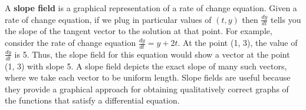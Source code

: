 \clearpage

A \textbf{slope field} is a graphical representation of a rate of change equation. Given a rate of change equation, if we plug in particular values of $(t,y)$ then $\displaystyle\frac{dy}{dt}$ tells you the slope of the tangent vector to the solution at that point.
\vs
For example, consider the rate of change equation $\displaystyle\frac{dy}{dt}=y+2t$.  At the point (1, 3), the value of $\displaystyle\frac{dy}{dt}$ is 5. Thus, the slope field for this equation would show a vector at the point (1, 3) with slope 5.  A slope field depicts the exact slope of many such vectors, where we take each vector to be uniform length. Slope fields are useful because they provide a graphical approach for obtaining qualitatively correct graphs of the functions that satisfy a differential equation.

